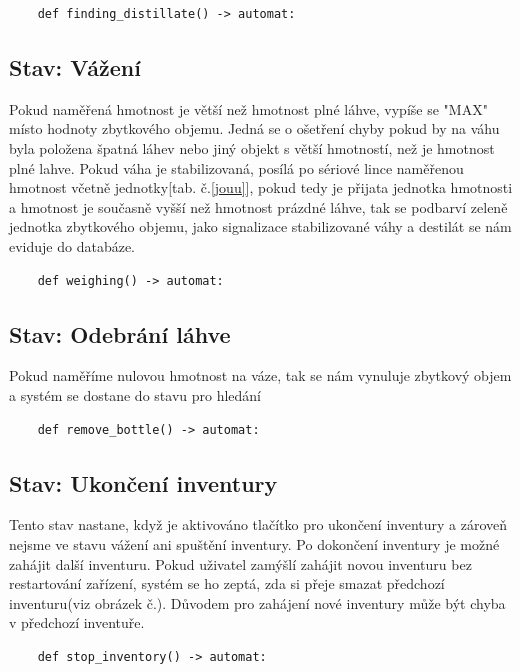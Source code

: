 \begin{lstlisting}
    def finding_distillate() -> automat:
\end{lstlisting}

\subsection{Stav: Vážení}

Pokud naměřená hmotnost je větší než hmotnost plné láhve, vypíše se "MAX" místo hodnoty zbytkového objemu. Jedná se o ošetření chyby pokud by na váhu byla položena špatná láhev nebo jiný objekt s větší hmotností, než je hmotnost plné lahve. Pokud váha je stabilizovaná, posílá po sériové lince naměřenou hmotnost včetně jednotky[tab. č.\ref{jouu}], pokud tedy je přijata jednotka hmotnosti a hmotnost je současně vyšší než hmotnost prázdné láhve, tak se podbarví zeleně jednotka zbytkového objemu, jako signalizace stabilizované váhy a destilát se nám eviduje do databáze.

\begin{lstlisting}
    def weighing() -> automat:
\end{lstlisting}

\subsection{Stav: Odebrání láhve}

Pokud naměříme nulovou hmotnost na váze, tak se nám vynuluje zbytkový objem a systém se dostane do stavu pro hledání

\begin{lstlisting}
    def remove_bottle() -> automat:
\end{lstlisting}

\subsection{Stav: Ukončení inventury}

Tento stav nastane, když je aktivováno tlačítko pro ukončení inventury a zároveň nejsme ve stavu vážení ani spuštění inventury. Po dokončení inventury je možné zahájit další inventuru. Pokud uživatel zamýšlí zahájit novou inventuru bez restartování zařízení, systém se ho zeptá, zda si přeje smazat předchozí inventuru(viz obrázek č.). Důvodem pro zahájení nové inventury může být chyba v předchozí inventuře.

\begin{lstlisting}
    def stop_inventory() -> automat:
\end{lstlisting}

